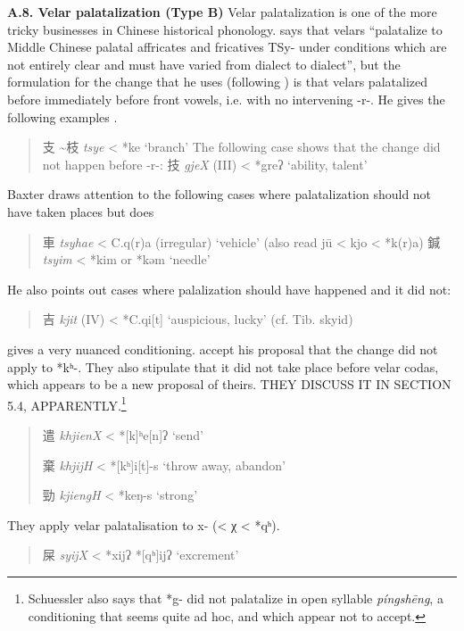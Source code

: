 \documentclass[xetex, svgnames, 12pt]{scrartcl}
\newcounter{para}
\newcommand\mypara[1]{\par\refstepcounter{para}\textbf{\thepara\space#1\space}}
\begin{document}
\mypara{A.8. Velar palatalization (Type B)}
Velar palatalization is one of the more tricky businesses in Chinese historical phonology. 
\citeauthor[]{Baxter1992} says that velars ``palatalize to Middle Chinese palatal affricates
 and fricatives TSy- under conditions which are not entirely clear and must have varied from
 dialect to dialect'', but the formulation for the change that he uses (following \citet[100]{Pulleyblank1962}) is that velars palatalized before immediately before front vowels, i.e. with no intervening -r-. He gives the following examples \citep[PAGES]{Baxter1992}.
 \begin{quote}
 支 \textasciitilde 枝 %
 \textit{tsye} < *ke `branch'
 The following case shows that the change did not happen before -r-:
 技 %
 \textit{gjeX} (III) < *greʔ `ability, talent'
 \end{quote}
Baxter draws attention to the following cases where palatalization should not have taken places but does 
\begin{quote}
 車 \textit{tsyhae} < C.q(r)a (irregular) `vehicle' (also read jū < kjo < *k(r)a)
 鍼 %
 \textit{tsyim} < *kim or *kəm `needle'
\end{quote} 
He also points out cases where palalization should have happened and it did not: 
\begin{quote}
 吉 %
 \textit{kjit} (IV) < *C.qi[t] `auspicious, lucky' (cf. Tib. skyid)
\end{quote}
\citet[]{Schuessler1996palatalization}
gives a very nuanced conditioning. \citep[78]{Baxter2014OldChinese} accept his proposal that the change did not apply to *kʰ-. They also stipulate that it did not take place before velar codas, which appears to be a new proposal of theirs. THEY DISCUSS IT IN SECTION 5.4, APPARENTLY.\footnote{Schuessler also says that *g- did not palatalize in open syllable  \textit{píngshēng}, a conditioning that seems quite ad hoc, and which \citeauthor[]{Baxter2014OldChinese} appear not to accept.} 
\begin{quote}

遣 %
\textit{khjienX} < *[k]ʰe[n]ʔ 
‘send’

棄 %
\textit{khjijH} < *[kʰ]i[t]-s ‘throw away, abandon’

勁 %
\textit{kjiengH} < *keŋ-s 
 ‘strong’
\end{quote}

They apply velar palatalisation to x- (< χ < *qʰ). 
\begin{quote}
屎 %
\textit{syijX} < *xijʔ *[qʰ]ijʔ  
‘excrement’ %
\end{quote}
\end{document}
